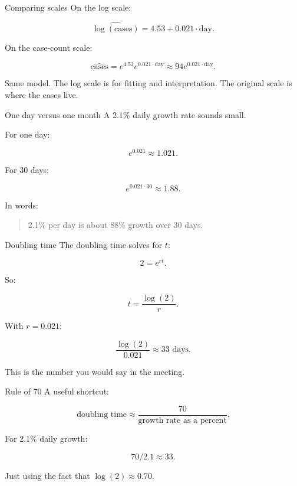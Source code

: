 \documentclass[
  ignorenonframetext,
  aspectratio=43,
]{beamer}
\begin{document}
\begin{frame}{Comparing scales}
\label{comparing-scales}
On the log scale:

\[
\widehat{\log(\text{cases})} = 4.53 + 0.021 \cdot \text{day}.
\]

On the case-count scale:

\[
\widehat{\text{cases}} = e^{4.53}e^{0.021 \cdot \text{day}}
\approx 94e^{0.021 \cdot \text{day}}.
\]

Same model. The log scale is for fitting and interpretation. The
original scale is where the cases live.
\end{frame}

\begin{frame}{One day versus one month}
\label{one-day-versus-one-month}
A 2.1\% daily growth rate sounds small.

For one day:

\[
e^{0.021} \approx 1.021.
\]

For 30 days:

\[
e^{0.021 \cdot 30} \approx 1.88.
\]

In words:

\begin{quote}
2.1\% per day is about 88\% growth over 30 days.
\end{quote}
\end{frame}

\begin{frame}{Doubling time}
\label{doubling-time}
The doubling time solves for \(t\):

\[
2 = e^{rt}.
\]

So:

\[
t = \frac{\log(2)}{r}.
\]

With \(r = 0.021\):

\[
\frac{\log(2)}{0.021} \approx 33 \text{ days}.
\]

This is the number you would say in the meeting.
\end{frame}

\begin{frame}{Rule of 70}
\label{rule-of-70}
A useful shortcut:

\[
\text{doubling time} \approx
\frac{70}{\text{growth rate as a percent}}.
\]

For 2.1\% daily growth:

\[
70 / 2.1 \approx 33.
\]

Just using the fact that \(\log(2) \approx 0.70\).
\end{frame}
\end{document}
